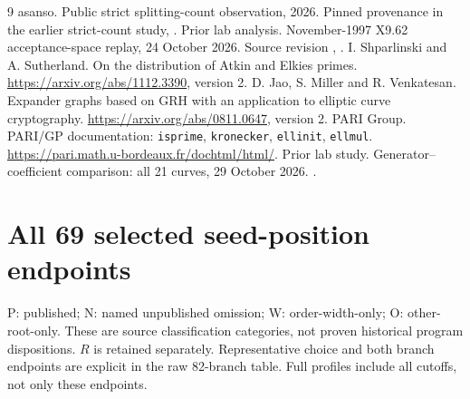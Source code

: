 \documentclass[10pt]{article}
\begin{document}
\begin{thebibliography}{9}\small
{} asanso. Public strict splitting-count observation, 2026.
Pinned provenance in the earlier strict-count study,
.
 Prior lab analysis. November-1997 X9.62 acceptance-space
replay, 24 October 2026. Source revision
,
.
 I. Shparlinski and A. Sutherland. On the distribution of Atkin
and Elkies primes. \url{https://arxiv.org/abs/1112.3390}, version 2.
 D. Jao, S. Miller and R. Venkatesan. Expander graphs based on
GRH with an application to elliptic curve cryptography.
\url{https://arxiv.org/abs/0811.0647}, version 2.
 PARI Group. PARI/GP documentation: \texttt{isprime},
\texttt{kronecker}, \texttt{ellinit}, \texttt{ellmul}.
\url{https://pari.math.u-bordeaux.fr/dochtml/html/}.
 Prior lab study. Generator--coefficient comparison: all 21 curves,
29 October 2026. .
\end{thebibliography}
\clearpage
\appendix
\section{All 69 selected seed-position endpoints}
P: published; N: named unpublished omission; W: order-width-only;
O: other-root-only. These are source classification categories, not proven
historical program dispositions. $R$ is retained separately. Representative
choice and both branch endpoints are explicit in the raw 82-branch table.
Full profiles include all cutoffs, not only these endpoints.

\begin{center}\small\end{center}
\end{document}
